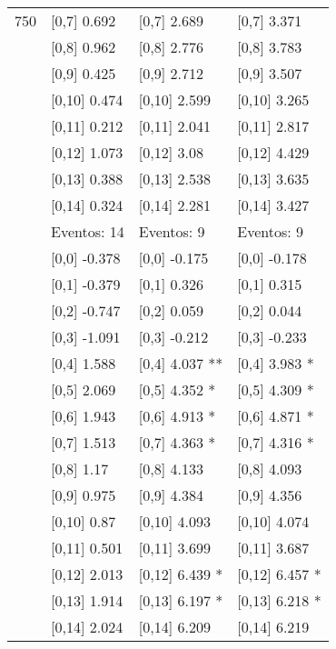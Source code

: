 \begin{table}
\begin{tabular}[t]{llll}
750 & {}[0,7] 0.692 & {}[0,7] 2.689 & {}[0,7] 3.371\\
\addlinespace
 & {}[0,8] 0.962 & {}[0,8] 2.776 & {}[0,8] 3.783\\
 & {}[0,9] 0.425 & {}[0,9] 2.712 & {}[0,9] 3.507\\
 & {}[0,10] 0.474 & {}[0,10] 2.599 & {}[0,10] 3.265\\
 & {}[0,11] 0.212 & {}[0,11] 2.041 & {}[0,11] 2.817\\
 & {}[0,12] 1.073 & {}[0,12] 3.08 & {}[0,12] 4.429\\
\addlinespace
 & {}[0,13] 0.388 & {}[0,13] 2.538 & {}[0,13] 3.635\\
 & {}[0,14] 0.324 & {}[0,14] 2.281 & {}[0,14] 3.427\\
 & Eventos:  14 & Eventos:  9 & Eventos:  9\\
 & {}[0,0] -0.378 & {}[0,0] -0.175 & {}[0,0] -0.178\\
 & {}[0,1] -0.379 & {}[0,1] 0.326 & {}[0,1] 0.315\\
\addlinespace
 & {}[0,2] -0.747 & {}[0,2] 0.059 & {}[0,2] 0.044\\
 & {}[0,3] -1.091 & {}[0,3] -0.212 & {}[0,3] -0.233\\
 & {}[0,4] 1.588 & {}[0,4] 4.037 ** & {}[0,4] 3.983 *\\
 & {}[0,5] 2.069 & {}[0,5] 4.352 * & {}[0,5] 4.309 *\\
 & {}[0,6] 1.943 & {}[0,6] 4.913 * & {}[0,6] 4.871 *\\
\addlinespace
1000 & {}[0,7] 1.513 & {}[0,7] 4.363 * & {}[0,7] 4.316 *\\
 & {}[0,8] 1.17 & {}[0,8] 4.133 & {}[0,8] 4.093\\
 & {}[0,9] 0.975 & {}[0,9] 4.384 & {}[0,9] 4.356\\
 & {}[0,10] 0.87 & {}[0,10] 4.093 & {}[0,10] 4.074\\
 & {}[0,11] 0.501 & {}[0,11] 3.699 & {}[0,11] 3.687\\
\addlinespace
 & {}[0,12] 2.013 & {}[0,12] 6.439 * & {}[0,12] 6.457 *\\
 & {}[0,13] 1.914 & {}[0,13] 6.197 * & {}[0,13] 6.218 *\\
 & {}[0,14] 2.024 & {}[0,14] 6.209 & {}[0,14] 6.219\\
\bottomrule
\end{tabular}
\end{table}
